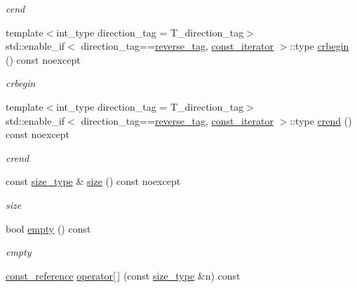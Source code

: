 \begin{DoxyCompactItemize}
\begin{DoxyCompactList}\small\item\em cend \end{DoxyCompactList}\item 
{\footnotesize template$<$int\+\_\+type direction\+\_\+tag = T\+\_\+direction\+\_\+tag$>$ }\\std\+::enable\+\_\+if$<$ direction\+\_\+tag==\hyperlink{namespaceIceBRG_a3f2c2517005b9902e3eb97894b072f91a9793d1e2c6b63e17ed62034e78307b63}{reverse\+\_\+tag}, \hyperlink{classIceBRG_1_1labeled__array__vecs_a6003abed56d6f931ce74524cda329972}{const\+\_\+iterator} $>$\+::type \hyperlink{classIceBRG_1_1labeled__array__vecs_afabf85abbc1a32c96514ad95cc2a8247}{crbegin} () const  noexcept
\begin{DoxyCompactList}\small\item\em crbegin \end{DoxyCompactList}\item 
{\footnotesize template$<$int\+\_\+type direction\+\_\+tag = T\+\_\+direction\+\_\+tag$>$ }\\std\+::enable\+\_\+if$<$ direction\+\_\+tag==\hyperlink{namespaceIceBRG_a3f2c2517005b9902e3eb97894b072f91a9793d1e2c6b63e17ed62034e78307b63}{reverse\+\_\+tag}, \hyperlink{classIceBRG_1_1labeled__array__vecs_a6003abed56d6f931ce74524cda329972}{const\+\_\+iterator} $>$\+::type \hyperlink{classIceBRG_1_1labeled__array__vecs_a08abbec5a8dbd327521ed6a793b87d83}{crend} () const  noexcept
\begin{DoxyCompactList}\small\item\em crend \end{DoxyCompactList}\item 
const \hyperlink{classIceBRG_1_1labeled__array__vecs_a9395382460f12145dc0c835e78283fdd}{size\+\_\+type} \& \hyperlink{classIceBRG_1_1labeled__array__vecs_a7ddf32112a8b25509f1c8be953f4c2ba}{size} () const  noexcept
\begin{DoxyCompactList}\small\item\em size \end{DoxyCompactList}\item 
bool \hyperlink{classIceBRG_1_1labeled__array__vecs_ae7390338a779738f1d262346c58fb5fd}{empty} () const 
\begin{DoxyCompactList}\small\item\em empty \end{DoxyCompactList}\item 
\hyperlink{classIceBRG_1_1labeled__array__vecs_a5ab1d23d61a03d4f64756b59f5773d41}{const\+\_\+reference} \hyperlink{classIceBRG_1_1labeled__array__vecs_aeb7746b3c184475a19f6fd9bcb1b02ca}{operator\mbox{[}$\,$\mbox{]}} (const \hyperlink{classIceBRG_1_1labeled__array__vecs_a9395382460f12145dc0c835e78283fdd}{size\+\_\+type} \&n) const 

\end{DoxyCompactItemize}

